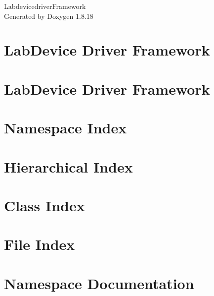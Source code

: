 \let\mypdfximage\pdfximage\def\pdfximage{\immediate\mypdfximage}\documentclass[twoside]{book}
\newcommand{\+}{\discretionary{\mbox{\scriptsize$\hookleftarrow$}}{}{}}
\newcommand{\clearemptydoublepage}{%
  \newpage{\pagestyle{empty}\cleardoublepage}%
}
\begin{document}
\hypersetup{pageanchor=false,
             bookmarksnumbered=true,
             pdfencoding=unicode
            }
\begin{titlepage}
\vspace*{7cm}
\begin{center}%
{\Large Labdevicedriver\+Framework }\\
\vspace*{1cm}
{\large Generated by Doxygen 1.8.18}\\
\end{center}
\end{titlepage}
\clearemptydoublepage
{}
\tableofcontents
\clearemptydoublepage
{}
\hypersetup{pageanchor=true}

\chapter{Lab\+Device Driver Framework}
\label{index}\hypertarget{index}{}
\chapter{Lab\+Device Driver Framework}
\label{md__home_thomas__h_f-_lab_emcframework_labdevicedrivers__r_e_a_d_m_e}

\chapter{Namespace Index}

\chapter{Hierarchical Index}

\chapter{Class Index}

\chapter{File Index}

\chapter{Namespace Documentation}




\end{document}
